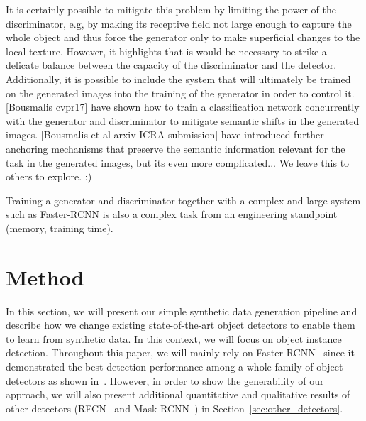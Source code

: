 \documentclass[10pt,twocolumn,letterpaper]{article}
\newcommand{\vincentrmk}[1]{{\color{ForestGreen}\bf #1}}
\newcommand{\comment}[1]{}
\begin{document}
{{It is certainly possible to mitigate this problem by limiting the power of the discriminator, e.g, by making its receptive field not large enough to capture the whole object and thus force the generator only to make superficial changes to the local texture. However, it highlights that is would be necessary to strike a delicate balance between the capacity of the discriminator and the detector.
Additionally, it is possible to include the system that will ultimately be trained on the generated images into the training of the generator in order to control it. [Bousmalis cvpr17] have shown how to train a classification network concurrently with the generator and discriminator to mitigate semantic shifts in the generated images. [Bousmalis et al arxiv ICRA submission] have introduced further anchoring mechanisms that preserve the semantic information relevant for the task in the generated images, but its even more complicated... We leave this to others to explore. :)

Training a generator and discriminator together with a complex and large system such as Faster-RCNN is also a complex task from an engineering standpoint (memory, training time).
}

}







\section{Method}

In this section,  we will present our simple synthetic  data generation pipeline
and describe how we change  existing state-of-the-art object detectors to enable
them to  learn from synthetic  data.  In this context,  we will focus  on object
instance   detection.   Throughout   this  paper,   we  will   mainly  rely   on
Faster-RCNN~\cite{faster_rcnn}   since  it   demonstrated  the   best  detection
performance among a whole family of object detectors as shown in~\cite{Huang17}.
However, in order to show the generability of our approach, we will also present
additional   quantitative   and   qualitative   results   of   other   detectors
(RFCN~\cite{rfcn}          and           Mask-RCNN~\cite{mask_rcnn})          in
Section~\ref{sec:other_detectors}.


\comment{
\vincentrmk{we need to mention https://arxiv.org/pdf/1411.7911.pdf somewhere}
}
\end{document}
